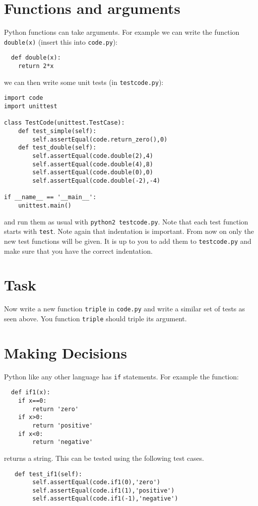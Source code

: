 \documentclass{paper}
\begin{document}
\section*{Functions and arguments}
Python functions can take arguments. For example we can write the
function {\tt double(x)} (insert this into {\tt code.py}):
\begin{lstlisting}
  def double(x):
    return 2*x
\end{lstlisting}
we can then write some unit tests (in {\tt testcode.py}):
\begin{lstlisting}
import code
import unittest

class TestCode(unittest.TestCase):
    def test_simple(self):
        self.assertEqual(code.return_zero(),0)
    def test_double(self):
        self.assertEqual(code.double(2),4)
        self.assertEqual(code.double(4),8)
        self.assertEqual(code.double(0),0)
        self.assertEqual(code.double(-2),-4)

if __name__ == '__main__':
    unittest.main()

\end{lstlisting} and run them as usual with {\tt python2 testcode.py}. Note that each test function starts
with {\tt test}. Note again that indentation is important. From now on only
the new test functions will be given. It is up to you to add them to
{\tt testcode.py} and make sure that you have the correct indentation.

\section{Task}
Now write a new function {\tt triple} in {\tt code.py} and write a
similar set of tests as seen above. You function {\tt triple} should triple
its argument.

\section*{Making Decisions}
Python like any other language has {\tt if} statements. For example
the function:
\begin{lstlisting}
  def if1(x):
    if x==0:
        return 'zero'
    if x>0:
        return 'positive'
    if x<0:
        return 'negative'
\end{lstlisting}
returns a string. This can be tested using the following test cases.
\begin{lstlisting}
   def test_if1(self):
        self.assertEqual(code.if1(0),'zero')
        self.assertEqual(code.if1(1),'positive')
        self.assertEqual(code.if1(-1),'negative')
\end{lstlisting}
\end{document}
